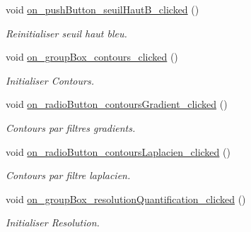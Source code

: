 \begin{DoxyCompactItemize}
\mbox{\label{classMainWindow_a0f1550fb16b2b9f9f167d357b0ac6210}} 
void \hyperlink{classMainWindow_a0f1550fb16b2b9f9f167d357b0ac6210}{on\+\_\+push\+Button\+\_\+seuil\+Haut\+B\+\_\+clicked} ()
\begin{DoxyCompactList}\small\item\em Reinitialiser seuil haut bleu. \end{DoxyCompactList}\item 
\mbox{\label{classMainWindow_a6a2703678a7578bc5a8644408266c202}} 
void \hyperlink{classMainWindow_a6a2703678a7578bc5a8644408266c202}{on\+\_\+group\+Box\+\_\+contours\+\_\+clicked} ()
\begin{DoxyCompactList}\small\item\em Initialiser Contours. \end{DoxyCompactList}\item 
\mbox{\label{classMainWindow_ac94c3ca9b44aaf147ca376d3a88b6ab2}} 
void \hyperlink{classMainWindow_ac94c3ca9b44aaf147ca376d3a88b6ab2}{on\+\_\+radio\+Button\+\_\+contours\+Gradient\+\_\+clicked} ()
\begin{DoxyCompactList}\small\item\em Contours par filtres gradients. \end{DoxyCompactList}\item 
\mbox{\label{classMainWindow_a1d04ac03f359e95a2abb371f0f0d82e1}} 
void \hyperlink{classMainWindow_a1d04ac03f359e95a2abb371f0f0d82e1}{on\+\_\+radio\+Button\+\_\+contours\+Laplacien\+\_\+clicked} ()
\begin{DoxyCompactList}\small\item\em Contours par filtre laplacien. \end{DoxyCompactList}\item 
\mbox{\label{classMainWindow_ae9b4e5c812b35987f1e188dc5f4ad534}} 
void \hyperlink{classMainWindow_ae9b4e5c812b35987f1e188dc5f4ad534}{on\+\_\+group\+Box\+\_\+resolution\+Quantification\+\_\+clicked} ()
\begin{DoxyCompactList}\small\item\em Initialiser Resolution. \end{DoxyCompactList}\item 
\mbox{\label{classMainWindow_a89fcd1468300d25c34b6c35188e8dd52}} 

\end{DoxyCompactItemize}
